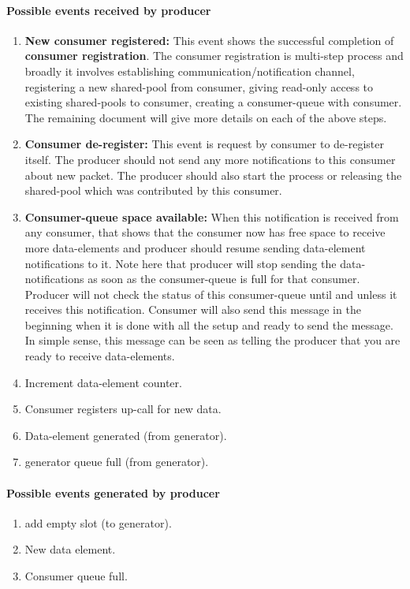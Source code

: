 \documentclass[a4paper,twoside]{report} %
\begin{document}
\paragraph{Possible events received by producer}
\begin{enumerate} 
  \item \textbf{New consumer registered:}  This event shows the
  successful completion of \textbf{consumer registration}.  The
  consumer registration is multi-step process and broadly it involves
  establishing communication/notification channel,
  registering a new shared-pool from consumer,
  giving read-only access to existing shared-pools to consumer,
  creating a consumer-queue with consumer.  
  The remaining document will give more details on each of the above
  steps.

  \item \textbf{Consumer de-register:} This event is request by
  consumer to de-register itself.  The producer should not send any
  more notifications to this consumer about new packet.  The producer
  should also start the process or releasing the shared-pool which was
  contributed by this consumer.

  \item \textbf{Consumer-queue space available:} When this
  notification is received from any consumer, that shows that the
  consumer now has free space to receive more data-elements and
  producer should resume sending data-element notifications to it.
  Note here that producer will stop sending the data-notifications as
  soon as the consumer-queue is full for that consumer. Producer will
  not check the status of this consumer-queue until and unless it
  receives this notification.  Consumer will also send this message in
  the beginning when it is done with all the setup and ready to send
  the message.  In simple sense, this message can be seen as telling
  the producer that you are ready to receive data-elements.

  \item Increment data-element counter.

  \item Consumer registers up-call for new data.
  \item Data-element generated (from generator).
  \item generator queue full (from generator).
\end{enumerate} 

\paragraph{Possible events generated by producer}
\begin{enumerate} 
  \item add empty slot (to generator). 
  \item New data element.
  \item Consumer queue full. 
\end{enumerate} 
\end{document}
